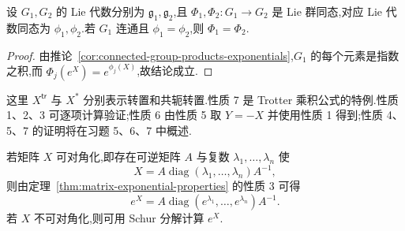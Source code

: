 {\begin{corollary}\label{cor:connected-homomorphism-determined}
设 $G_1,G_2$ 的 Lie 代数分别为 $\mathfrak g_1,\mathfrak g_2$,且 $\Phi_1,\Phi_2:G_1\to G_2$ 是 Lie 群同态,对应 Lie 代数同态为 $\phi_1,\phi_2$.若 $G_1$ 连通且 $\phi_1=\phi_2$,则 $\Phi_1=\Phi_2$.
\end{corollary}

\begin{proof}
由推论~\ref{cor:connected-group-products-exponentials},$G_1$ 的每个元素是指数之积,而 $\Phi_j(e^X)=e^{\phi_j(X)}$,故结论成立.
\end{proof}

这里 $X^{\mathsf{tr}}$ 与 $X^*$ 分别表示转置和共轭转置.性质 7 是 Trotter 乘积公式的特例.性质 1、2、3 可逐项计算验证;性质 6 由性质 5 取 $Y=-X$ 并使用性质 1 得到;性质 4、5、7 的证明将在习题 5、6、7 中概述.

若矩阵 $X$ 可对角化,即存在可逆矩阵 $A$ 与复数 $\lambda_1,\ldots,\lambda_n$ 使
\[
X=A\operatorname{diag}(\lambda_1,\ldots,\lambda_n)A^{-1},
\]
则由定理~\ref{thm:matrix-exponential-properties} 的性质 3 可得
\[
e^X=A\operatorname{diag}(e^{\lambda_1},\ldots,e^{\lambda_n})A^{-1}.
\]
若 $X$ 不可对角化,则可用 Schur 分解计算 $e^X$.

}

\def\ChapterSixteenMatrixExponentialExample{
\begin{example}[二维旋转矩阵的指数]\label{ex:rotation-matrix-exponential}
若
\[
X=\begin{pmatrix}0&a\\-a&0\end{pmatrix},
\]
则
\[
e^X=\begin{pmatrix}\cos a&\sin a\\-\sin a&\cos a\end{pmatrix}.
\]
\end{example}

\begin{proof}
$X$ 的特征值为 $\pm ia$,相应特征向量为 $(1,\pm i)$.对角化并计算后得到上式.
\end{proof}

一般而言,关系 $e^{X+Y}=e^Xe^Y$ 不成立.不过,对任意 $X\in M_n(\mathbb C)$ 及 $s,t\in\mathbb R$,由于 $sX$ 与 $tX$ 对易,有
\[
e^{(s+t)X}=e^{sX}e^{tX}.
\]
因此,对每个 $X$,形如 $e^{tX}$、$t\in\mathbb R$ 的矩阵构成 $\operatorname{GL}(n;\mathbb C)$ 的一个子群.逐项微分可知
\[
\left.\frac{d}{dt}e^{tX}\right|_{t=0}=X.
\label{eq:matrix-exponential-derivative}
\]

\begin{definition}[单参数子群]\label{def:one-parameter-subgroup}
$\operatorname{GL}(n;\mathbb C)$ 的单参数子群是从 $\mathbb R$ 到 $\operatorname{GL}(n;\mathbb C)$ 的连续同态,即连续映射 $A:\mathbb R\to\operatorname{GL}(n;\mathbb C)$,满足 $A(0)=I$ 且 $A(s+t)=A(s)A(t)$.
\end{definition}

\begin{theorem}[单参数子群的指数表示]\label{thm:one-parameter-exponential}
若 $A(\cdot)$ 是单参数子群,则存在唯一的 $X\in M_n(\mathbb C)$,使对所有 $t\in\mathbb R$ 都有
\[
A(t)=e^{tX}.
\]
\end{theorem}
}


